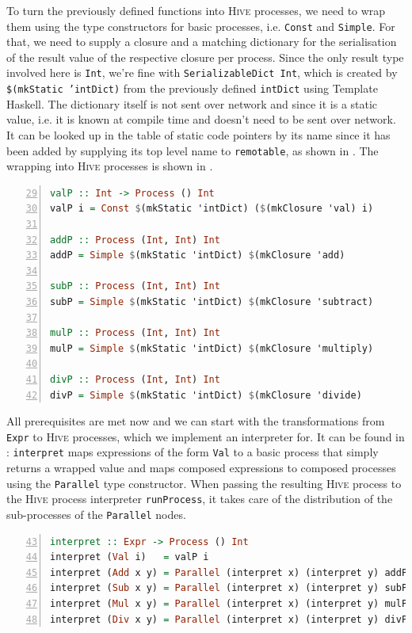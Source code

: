 To turn the previously defined functions into \textsc{Hive} processes, we need to wrap them using the type constructors for basic processes, i.e. \texttt{Const} and \texttt{Simple}. For that, we need to supply a closure and a matching dictionary for the serialisation of the result value of the respective closure per process. Since the only result type involved here is \texttt{Int}, we're fine with \texttt{SerializableDict Int}, which is created by \texttt{\$(mkStatic 'intDict)} from the previously defined \texttt{intDict} using \textsf{Template Haskell}. The dictionary itself is not sent over network and since it is a static value, i.e. it is known at compile time and doesn't need to be sent over network. It can be looked up in the table of static code pointers by its name since it has been added by supplying its top level name to \texttt{remotable}, as shown in . The wrapping into \textsc{Hive} processes is shown in .
\begin{lstlisting}[language=Haskell, caption=Creating function closures and wrapping them into \textsc{Hive} processes., label=lst:arith_wrapping, numbers=left, frame=bt, firstnumber=29]
valP :: Int -> Process () Int
valP i = Const $(mkStatic 'intDict) ($(mkClosure 'val) i)

addP :: Process (Int, Int) Int
addP = Simple $(mkStatic 'intDict) $(mkClosure 'add)

subP :: Process (Int, Int) Int
subP = Simple $(mkStatic 'intDict) $(mkClosure 'subtract)

mulP :: Process (Int, Int) Int
mulP = Simple $(mkStatic 'intDict) $(mkClosure 'multiply)

divP :: Process (Int, Int) Int
divP = Simple $(mkStatic 'intDict) $(mkClosure 'divide)
\end{lstlisting}

All prerequisites are met now and we can start with the transformations from \texttt{Expr} to \textsc{Hive} processes, which we implement an interpreter for. It can be found in : \texttt{interpret} maps expressions of the form \texttt{Val} to a basic process that simply returns a wrapped value and maps composed expressions to composed processes using the \texttt{Parallel} type constructor. When passing the resulting \textsc{Hive} process to the \textsc{Hive} process interpreter \texttt{runProcess}, it takes care of the distribution of the sub-processes of the \texttt{Parallel} nodes.
\begin{lstlisting}[language=Haskell, caption=Transformation from \texttt{Expr} to \textsc{Hive} processes., label=lst:arith_transformation, numbers=left, frame=bt, firstnumber=43]
interpret :: Expr -> Process () Int
interpret (Val i)   = valP i
interpret (Add x y) = Parallel (interpret x) (interpret y) addP
interpret (Sub x y) = Parallel (interpret x) (interpret y) subP
interpret (Mul x y) = Parallel (interpret x) (interpret y) mulP
interpret (Div x y) = Parallel (interpret x) (interpret y) divP
\end{lstlisting}

